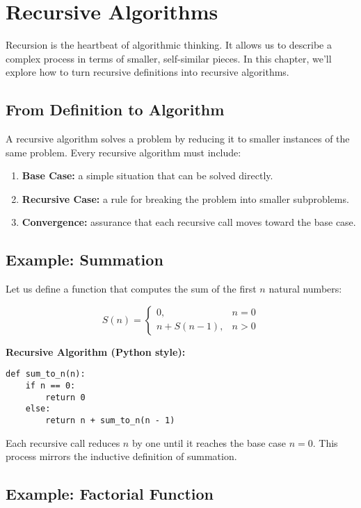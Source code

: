 \chapter{Recursive Algorithms}

Recursion is the heartbeat of algorithmic thinking.  
It allows us to describe a complex process in terms of smaller, self-similar pieces.  
In this chapter, we’ll explore how to turn recursive definitions into recursive algorithms.

\section{From Definition to Algorithm}

A recursive algorithm solves a problem by reducing it to smaller instances of the same problem.
Every recursive algorithm must include:

\begin{enumerate}
  \item \textbf{Base Case:} a simple situation that can be solved directly.
  \item \textbf{Recursive Case:} a rule for breaking the problem into smaller subproblems.
  \item \textbf{Convergence:} assurance that each recursive call moves toward the base case.
\end{enumerate}

\section{Example: Summation}

Let us define a function that computes the sum of the first $n$ natural numbers:

\[
S(n) =
\begin{cases}
0, & n = 0 \\
n + S(n-1), & n > 0
\end{cases}
\]

\noindent
\textbf{Recursive Algorithm (Python style):}

\begin{verbatim}
def sum_to_n(n):
    if n == 0:
        return 0
    else:
        return n + sum_to_n(n - 1)
\end{verbatim}

Each recursive call reduces $n$ by one until it reaches the base case $n = 0$.
This process mirrors the inductive definition of summation.

\section{Example: Factorial Function}

